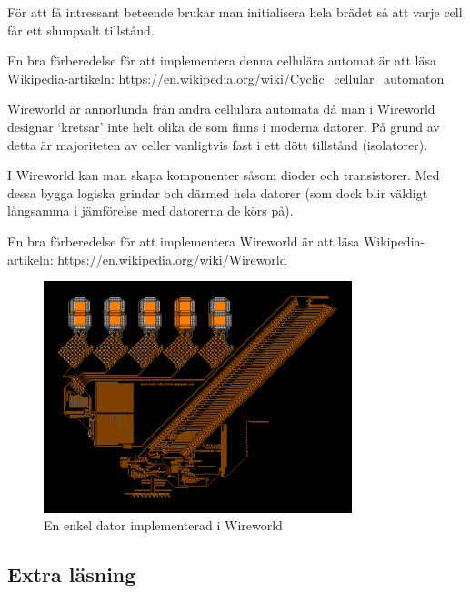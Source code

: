         För att få intressant beteende brukar man initialisera hela brädet så att varje cell får ett slumpvalt tillstånd.

        En bra förberedelse för att implementera denna cellulära automat är att läsa Wikipedia-artikeln: \url{https://en.wikipedia.org/wiki/Cyclic_cellular_automaton}


        Wireworld är annorlunda från andra cellulära automata då man i Wireworld designar `kretsar' inte helt olika de som finns i moderna datorer.
        På grund av detta är majoriteten av celler vanligtvis fast i ett dött tillstånd (isolatorer).

        I Wireworld kan man skapa komponenter såsom dioder och transistorer. Med dessa bygga logiska grindar och därmed hela datorer (som dock blir väldigt långsamma i jämförelse med datorerna de körs på).

        En bra förberedelse för att implementera Wireworld är att läsa Wikipedia-artikeln: \url{https://en.wikipedia.org/wiki/Wireworld}

        \begin{figure}[h]
            \begin{center}
                \includegraphics[width=0.8\textwidth]{../img/w12-lab/wireworld_computer.png}
            \end{center}
            \caption{En enkel dator implementerad i Wireworld\protect\footnotemark}
        \end{figure}


\subsection{Extra läsning}

